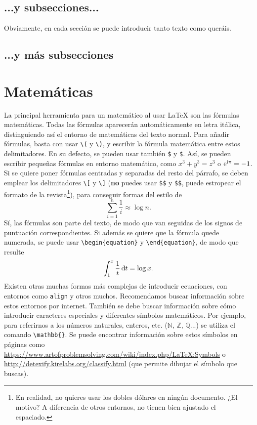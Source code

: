 \documentclass[bibtex]{TEMat-article}
\begin{document}
\subsection{...y subsecciones...}

Obviamente, en cada sección se puede introducir tanto texto como queráis.

\subsection{...y más subsecciones}

\section{Matemáticas}

La principal herramienta para un matemático al usar \LaTeX{} son las fórmulas matemáticas.
Todas las fórmulas aparecerán automáticamente en letra itálica, distinguiendo así el entorno de matemáticas del texto normal.
Para añadir fórmulas, basta con usar \verb+\(+ y \verb+\)+, y escribir la fórmula matemática entre estos delimitadores.
En su defecto, se pueden usar también \verb+$+ y \verb+$+.
Así, se pueden escribir pequeñas fórmulas en entorno matemático, como \(x^3+y^3=z^3\) o $\mathrm{e}^{\mathrm{i}\pi}=-1$.
Si se quiere poner fórmulas centradas y separadas del resto del párrafo, se deben emplear los delimitadores \verb+\[+ y \verb+\]+ (\textbf{no} puedes usar \verb+$$+ y \verb+$$+, puede estropear el formato de la revista\footnote{En realidad, no quieres usar los dobles dólares en ningún documento. ¿El motivo? A diferencia de otros entornos, no tienen bien ajustado el espaciado.}), para conseguir formas del estilo de
\[\sum_{i=1}^n\frac{1}{i}\approx\log n.\]
Sí, las fórmulas son parte del texto, de modo que van seguidas de los signos de puntuación correspondientes.
Si además se quiere que la fórmula quede numerada, se puede usar \verb+\begin{equation}+ y \verb+\end{equation}+, de modo que resulte
\begin{equation}\label{equa:ejemplo1}
\int_{1}^x\frac{1}{t} \mathop{}\!\mathrm{d} t = \log x.
\end{equation}
Existen otras muchas formas más complejas de introducir ecuaciones, con entornos como \verb+align+ y otros muchos.
Recomendamos buscar información sobre estos entornos por internet.
También se debe buscar información sobre cómo introducir caracteres especiales y diferentes símbolos matemáticos.
Por ejemplo, para referirnos a los números naturales, enteros, etc. ($\mathbb{N}$, $\mathbb{Z}$, $\mathbb{Q}$...) se utiliza el comando \verb+\mathbb{}+.
Se puede encontrar información sobre estos símbolos en páginas como \url{https://www.artofproblemsolving.com/wiki/index.php/LaTeX:Symbols} o \url{http://detexify.kirelabs.org/classify.html} (que permite dibujar el símbolo que buscas).
\end{document}

